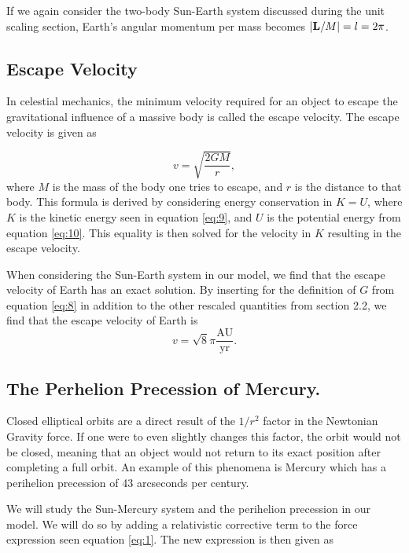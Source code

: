 \documentclass[a4paper, 10pt, reqno]{amsart}
\begin{document}
\noindent If we again consider the two-body Sun-Earth system discussed during the unit scaling section, Earth's angular momentum per mass becomes $\abs{\mathbf{L}/M} = l = 2 \pi$.

\subsection{Escape Velocity}\label{subsec:escapevel} In celestial mechanics, the minimum velocity required for an object to escape the gravitational influence of a massive body is called the escape velocity. The escape velocity is given as 

\begin{equation}\label{eq:11}
    v = \sqrt{\frac{2GM}{r}},
\end{equation}
where $M$ is the mass of the body one tries to escape, and $r$ is the distance to that body. This formula is derived by considering energy conservation in $K = U$, where $K$ is the kinetic energy seen in equation \eqref{eq:9}, and $U$ is the potential energy from equation \eqref{eq:10}. This equality is then solved for the velocity in $K$ resulting in the escape velocity.

When considering the Sun-Earth system in our model, we find that the escape velocity of Earth has an exact solution. By inserting for the definition of $G$ from equation \eqref{eq:8} in addition to the other rescaled quantities from section 2.2, we find that the escape velocity of Earth is 
\begin{equation}\label{eq:12}
    v = \sqrt{8}\pi  \frac{\text{AU}}{\text{yr}}.
\end{equation}

\subsection{The Perhelion Precession of Mercury.}
Closed elliptical orbits are a direct result of the $1/r^2$ factor in the Newtonian Gravity force. If one were to even slightly changes this factor, the orbit would not be closed, meaning that an object would not return to its exact position after completing a full orbit. An example of this phenomena is Mercury which has a perihelion precession of 43 arcseconds per century.

We will study the Sun-Mercury system and the perihelion precession in our model. We will do so by adding a relativistic  corrective term to the force expression seen equation \eqref{eq:1}. The new expression is then given as
\end{document}
